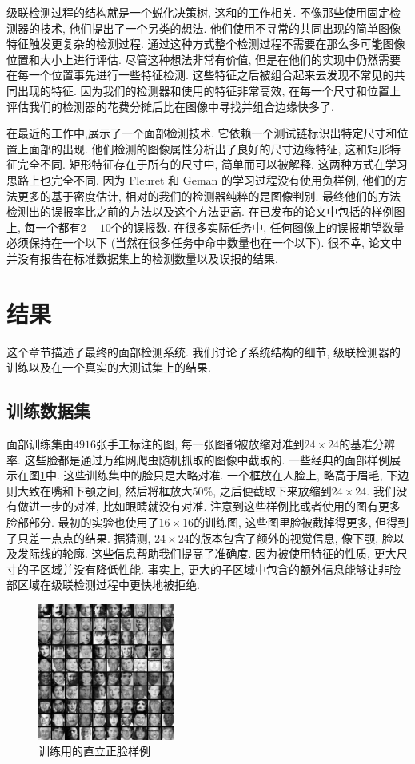 \documentclass[a4paper,utf8,11pt, onecolumn]{ctexart}
\begin{document}
级联检测过程的结构就是一个蜕化决策树, 这和\citet{amit1999computational}的工作相关. 不像那些使用固定检测器的技术, 他们提出了一个另类的想法. 他们使用不寻常的共同出现的简单图像特征触发更复杂的检测过程.
通过这种方式整个检测过程不需要在那么多可能图像位置和大小上进行评估. 尽管这种想法非常有价值, 但是在他们的实现中仍然需要在每一个位置事先进行一些特征检测. 这些特征之后被组合起来去发现不常见的共同出现的特征. 因为我们的检测器和使用的特征非常高效, 在每一个尺寸和位置上评估我们的检测器的花费分摊后比在图像中寻找并组合边缘快多了.

在最近的工作中,\citet{fleuret2001coarse}展示了一个面部检测技术. 它依赖一个测试链标识出特定尺寸和位置上面部的出现. 他们检测的图像属性分析出了良好的尺寸边缘特征, 这和矩形特征完全不同. 矩形特征存在于所有的尺寸中, 简单而可以被解释. 这两种方式在学习思路上也完全不同.
因为 Fleuret 和 Geman 的学习过程没有使用负样例, 他们的方法更多的基于密度估计, 相对的我们的检测器纯粹的是图像判别. 最终他们的方法检测出的误报率比之前\citet{rowley1998neural}的方法以及这个方法更高. 在已发布的论文中包括的样例图上, 每一个都有$2-10$个的误报数. 在很多实际任务中, 任何图像上的误报期望数量必须保持在一个以下 (当然在很多任务中命中数量也在一个以下). 很不幸, 论文中并没有报告在标准数据集上的检测数量以及误报的结果.
\section{结果}\label{sec:result}
这个章节描述了最终的面部检测系统. 我们讨论了系统结构的细节, 级联检测器的训练以及在一个真实的大测试集上的结果.
\subsection{训练数据集}
面部训练集由$4916$张手工标注的图, 每一张图都被放缩对准到$24\times24$的基准分辨率. 这些脸都是通过万维网爬虫随机抓取的图像中截取的. 一些经典的面部样例展示在图\ref{fig:face_used}中. 这些训练集中的脸只是大略对准. 一个框放在人脸上, 略高于眉毛, 下边则大致在嘴和下颚之间, 然后将框放大$50\%$, 之后便截取下来放缩到$24\times24$. 我们没有做进一步的对准, 比如眼睛就没有对准. 注意到这些样例比\citet{rowley1998neural}或者\citet{sung1998example}使用的图有更多脸部部分. 最初的实验也使用了$16\times16$的训练图, 这些图里脸被截掉得更多, 但得到了只差一点点的结果. 据猜测, $24\times24$的版本包含了额外的视觉信息, 像下颚, 脸以及发际线的轮廓. 这些信息帮助我们提高了准确度. 因为被使用特征的性质, 更大尺寸的子区域并没有降低性能. 事实上, 更大的子区域中包含的额外信息能够让非脸部区域在级联检测过程中更快地被拒绝.
\begin{figure}
\centering
\includegraphics[width=0.4\textwidth]{face_used.png}
\caption{训练用的直立正脸样例}
\label{fig:face_used}
\end{figure}
\end{document}
